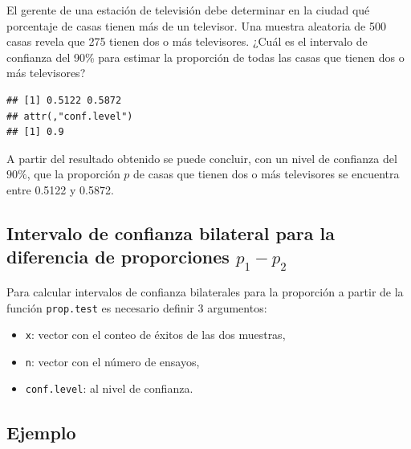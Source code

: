 \documentclass[10pt,]{krantz}
\makeatletter
\newenvironment{Shaded}{\begin{snugshade}}{\end{snugshade}}
\newcommand{\KeywordTok}[1]{\textcolor[rgb]{0.13,0.29,0.53}{\textbf{{#1}}}}
\newcommand{\DataTypeTok}[1]{\textcolor[rgb]{0.13,0.29,0.53}{{#1}}}
\newcommand{\DecValTok}[1]{\textcolor[rgb]{0.00,0.00,0.81}{{#1}}}
\newcommand{\FloatTok}[1]{\textcolor[rgb]{0.00,0.00,0.81}{{#1}}}
\newcommand{\NormalTok}[1]{{#1}}
\providecommand{\tightlist}{%
  \setlength{\itemsep}{0pt}\setlength{\parskip}{0pt}}
\newenvironment{kframe}{%
\medskip{}
\setlength{\fboxsep}{.8em}
 \def\at@end@of@kframe{}%
 \ifinner\ifhmode%
  \def\at@end@of@kframe{\end{minipage}}%
  \begin{minipage}{\columnwidth}%
 \fi\fi%
 \def\FrameCommand##1{\hskip\@totalleftmargin \hskip-\fboxsep
 \colorbox{shadecolor}{##1}\hskip-\fboxsep
     \hskip-\linewidth \hskip-\@totalleftmargin \hskip\columnwidth}%
 \MakeFramed {\advance\hsize-\width
   \@totalleftmargin\z@ \linewidth\hsize
   \@setminipage}}%
 {\par\unskip\endMakeFramed%
 \at@end@of@kframe}
\renewenvironment{Shaded}{\begin{kframe}}{\end{kframe}}
\makeatother
\begin{document}
El gerente de una estación de televisión debe determinar en la ciudad
qué porcentaje de casas tienen más de un televisor. Una muestra
aleatoria de 500 casas revela que 275 tienen dos o más televisores.
¿Cuál es el intervalo de confianza del 90\% para estimar la proporción
de todas las casas que tienen dos o más televisores?

\begin{Shaded}
\end{Shaded}

\begin{verbatim}
## [1] 0.5122 0.5872
## attr(,"conf.level")
## [1] 0.9
\end{verbatim}

A partir del resultado obtenido se puede concluir, con un nivel de
confianza del \(90\%\), que la proporción \(p\) de casas que tienen dos
o más televisores se encuentra entre 0.5122 y 0.5872.

\subsection{\texorpdfstring{Intervalo de confianza bilateral para la
diferencia de proporciones
\(p_1 - p_2\)}{Intervalo de confianza bilateral para la diferencia de proporciones p\_1 - p\_2}}\label{intervalo-de-confianza-bilateral-para-la-diferencia-de-proporciones-p_1---p_2}

Para calcular intervalos de confianza bilaterales para la proporción a
partir de la función \texttt{prop.test} es necesario definir 3
argumentos:

\begin{itemize}
\tightlist
\item
  \texttt{x}: vector con el conteo de éxitos de las dos muestras,
\item
  \texttt{n}: vector con el número de ensayos,
\item
  \texttt{conf.level}: al nivel de confianza.
\end{itemize}

\subsection*{Ejemplo}\label{ejemplo-60}
\end{document}
